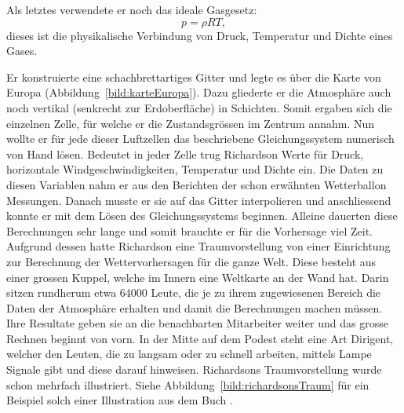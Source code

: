 Als letztes verwendete er noch das ideale Gasgesetz:
\begin{equation}
	p = \rho R T,
	\label{eq:gasgesetz}
\end{equation}
dieses ist die physikalische Verbindung von Druck, Temperatur und Dichte eines Gases.  

Er konstruierte eine schachbrettartiges Gitter und legte es über die Karte von Europa (Abbildung~\ref{bild:karteEuropa}).
Dazu gliederte er die Atmosphäre auch noch vertikal (senkrecht zur Erdoberfläche) in Schichten.
Somit ergaben sich die einzelnen Zelle, für welche er die Zustandsgrössen im Zentrum annahm. 
Nun wollte er für jede dieser Luftzellen das beschriebene Gleichungssystem numerisch von Hand lösen.
Bedeutet in jeder Zelle trug Richardson Werte für Druck, horizontale Windgeschwindigkeiten, Temperatur und Dichte ein.
Die Daten zu diesen Variablen nahm er aus den Berichten der schon erwähnten Wetterballon Messungen.
Danach musste er sie auf das Gitter interpolieren und anschliessend konnte er mit dem Lösen des Gleichungssystems beginnen.
Alleine dauerten diese Berechnungen sehr lange und somit brauchte er für die Vorhersage viel Zeit.
Aufgrund dessen hatte Richardson eine Traumvorstellung von einer Einrichtung zur Berechnung der Wettervorhersagen für die ganze Welt.
Diese besteht aus einer grossen Kuppel, welche im Innern eine Weltkarte an der Wand hat. 
Darin sitzen rundherum etwa 64000 Leute, die je zu ihrem zugewiesenen Bereich die Daten der Atmosphäre erhalten und damit die Berechnungen machen müssen. 
Ihre Resultate geben sie an die benachbarten Mitarbeiter weiter und das grosse Rechnen beginnt von vorn. 
In der Mitte auf dem Podest steht eine Art \glqq Dirigent\grqq, welcher den Leuten, die zu langsam oder zu schnell arbeiten, mittels Lampe Signale gibt und diese darauf hinweisen.
Richardsons Traumvorstellung wurde schon mehrfach illustriert.
Siehe Abbildung~\ref{bild:richardsonsTraum} für ein Beispiel solch einer Illustration aus dem Buch \cite{geostrophisch:richardsonsDream}.

